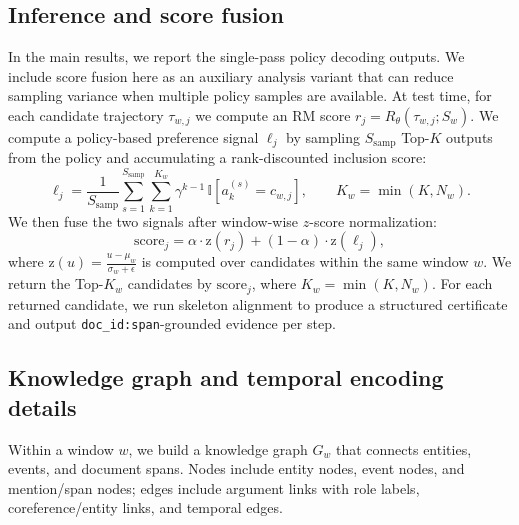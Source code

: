 \documentclass{article}
\begin{document}
\subsection{Inference and score fusion}
\label{sec:app_inference_fusion}
In the main results, we report the single-pass policy decoding outputs.
We include score fusion here as an auxiliary analysis variant that can reduce sampling variance when multiple policy samples are available.
At test time, for each candidate trajectory $\tau_{w,j}$ we compute an RM score $r_j=R_\theta(\tau_{w,j};S_w)$.
We compute a policy-based preference signal $\ell_j$ by sampling $S_{\mathrm{samp}}$ Top-$K$ outputs from the policy and accumulating a rank-discounted inclusion score:
\begin{equation}
\ell_j=\frac{1}{S_{\mathrm{samp}}}
\sum_{s=1}^{S_{\mathrm{samp}}}
\sum_{k=1}^{K_w}
\gamma^{k-1}\,
\mathbb{I}\!\left[a_k^{(s)}=c_{w,j}\right],
\qquad K_w=\min(K,N_w).
\end{equation}
We then fuse the two signals after window-wise $z$-score normalization:
\begin{equation}
\mathrm{score}_j
= \alpha \cdot \mathrm{z}(r_j)
+ (1-\alpha)\cdot \mathrm{z}(\ell_j),
\end{equation}
where $\mathrm{z}(u)=\frac{u-\mu_w}{\sigma_w+\epsilon}$ is computed over candidates within the same window $w$.
We return the Top-$K_w$ candidates by $\mathrm{score}_j$, where $K_w=\min(K,N_w)$.
For each returned candidate, we run skeleton alignment to produce a structured certificate and output \texttt{doc\_id:span}-grounded evidence per step.

\subsection{Knowledge graph and temporal encoding details}
\label{sec:app_tgn}

Within a window $w$, we build a knowledge graph $G_w$ that connects entities, events, and document spans.
Nodes include entity nodes, event nodes, and mention/span nodes; edges include argument links with role labels, coreference/entity links, and temporal edges.
\end{document}
